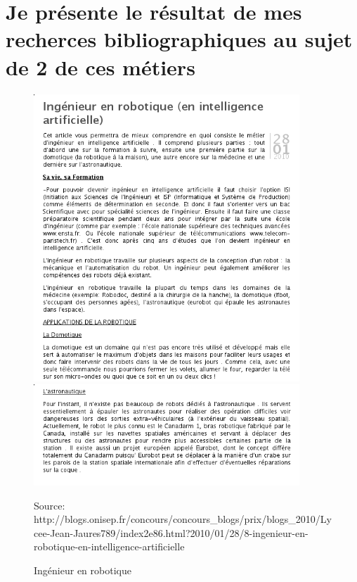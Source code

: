 \documentclass[10pt]{article}
\begin{document}
\section{Je présente le résultat de mes recherces bibliographiques au sujet de 2 de ces métiers}
\begin{figure}
    \begin{center}
        \includegraphics[width=10cm]{ir}
        \includegraphics[width=10cm]{ir2}
    \end{center}
    \caption{Ingénieur en robotique}
    Source: http://blogs.onisep.fr/concours/concours\_blogs/prix/blogs\_2010/Lycee-Jean-Jaures789/index2e86.html?2010/01/28/8-ingenieur-en-robotique-en-intelligence-artificielle
\end{figure}
\end{document}
